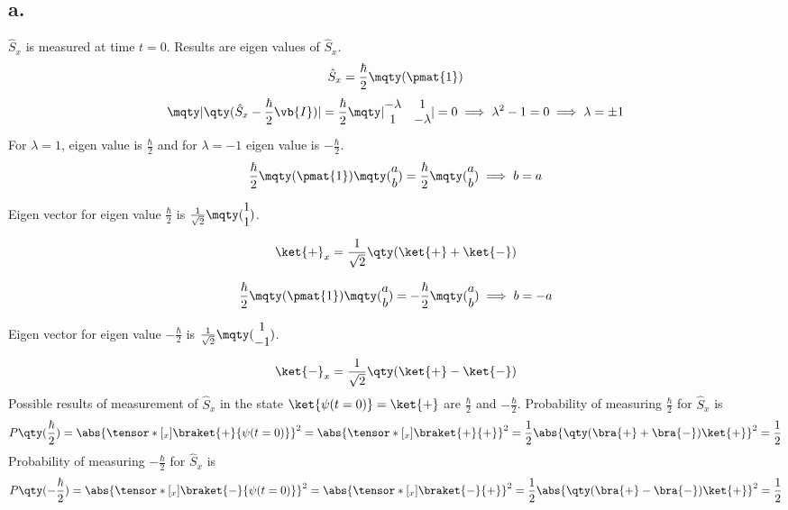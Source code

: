 \subsection*{a.}
$\hat{S}_x$ is measured at time $t=0$. Results are eigen values of $\hat{S}_x$.
\[\hat{S}_x=\frac{\hbar}{2}\mqty(\pmat{1})\]
\[\mqty|\qty(\hat{S}_x-\frac{\hbar}{2}\vb{I})|=\frac{\hbar}{2}\mqty|\begin{matrix}-\lambda & 1 \\ 1& -\lambda\end{matrix}|=0\implies\lambda^2-1=0\implies\lambda=\pm 1\]
For $\lambda=1$, eigen value is $\frac{\hbar}{2}$ and for $\lambda=-1$ eigen value is $-\frac{\hbar}{2}$.
\[\frac{\hbar}{2}\mqty(\pmat{1})\mqty(\begin{matrix}a\\b\end{matrix})=\frac{\hbar}{2}\mqty(\begin{matrix}a\\b\end{matrix})\implies b=a\]
Eigen vector for eigen value $\frac{\hbar}{2}$ is $\frac{1}{\sqrt{2}}\mqty(\begin{matrix}1\\1\end{matrix})$.
\[\ket{+}_x=\frac{1}{\sqrt{2}}\qty(\ket{+}+\ket{-})\]

\[\frac{\hbar}{2}\mqty(\pmat{1})\mqty(\begin{matrix}a\\b\end{matrix})=-\frac{\hbar}{2}\mqty(\begin{matrix}a\\b\end{matrix})\implies b=-a\]
Eigen vector for eigen value $-\frac{\hbar}{2}$ is $\frac{1}{\sqrt{2}}\mqty(\begin{matrix}1\\-1\end{matrix})$.
\[\ket{-}_x=\frac{1}{\sqrt{2}}\qty(\ket{+}-\ket{-})\]
Possible results of measurement of $\hat{S}_x$ in the state $\ket{\psi(t=0)}=\ket{+}$ are $\frac{\hbar}{2}$ and $-\frac{\hbar}{2}$.
Probability of measuring $\frac{\hbar}{2}$ for $\hat{S}_x$ is 
\[P\qty(\frac{\hbar}{2})=\abs{\tensor*[_x]{\braket{+}{\psi(t=0)}}{}}^2=\abs{\tensor*[_x]{\braket{+}{+}}{}}^2=\frac{1}{2}\abs{\qty(\bra{+}+\bra{-})\ket{+}}^2=\frac{1}{2}\]
Probability of measuring $-\frac{\hbar}{2}$ for $\hat{S}_x$ is 
\[P\qty(-\frac{\hbar}{2})=\abs{\tensor*[_x]{\braket{-}{\psi(t=0)}}{}}^2=\abs{\tensor*[_x]{\braket{-}{+}}{}}^2=\frac{1}{2}\abs{\qty(\bra{+}-\bra{-})\ket{+}}^2=\frac{1}{2}\]
